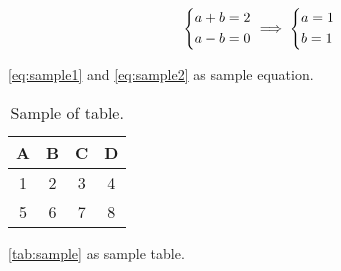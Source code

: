 \begin{equation}\label{eq:sample2}
	\begin{dcases}
		a + b = 2\\
		a - b = 0
	\end{dcases}
	\implies
	\begin{dcases}
		a = 1\\
		b = 1
	\end{dcases}
\end{equation}

\autoref{eq:sample1} and \ref{eq:sample2} as sample equation.


\begin{table} [h]
	\centering
	\caption{Sample of table.}
	\begin{tabular}{|c|c|c|c|}
		\hline
		\textbf{A} & \textbf{B} & \textbf{C} & \textbf{D} \\
		\hline
		1 & 2 & 3 & 4 \\
		\hline
		5 & 6 & 7 & 8 \\
		\hline
	\end{tabular}
	\label{tab:sample}
\end{table}

\autoref{tab:sample} as sample table.